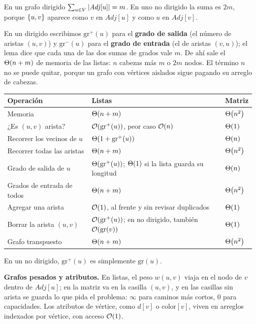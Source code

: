 \documentclass[11pt,letterpaper]{article}
\begin{document}
\begin{lema}
  \label{lem:busq-longitud-listas}
  En un grafo dirigido $\sum_{u \in V} \left\lvert \mathit{Adj}[u] \right\rvert = m$. En
  uno no dirigido la suma es $2m$, porque $\left\{ u, v \right\}$ aparece como
  $v$ en $\mathit{Adj}[u]$ y como $u$ en $\mathit{Adj}[v]$.
\end{lema}

En un dirigido escribimos $\text{gr}^{+}(u)$ para el \textbf{grado de
salida} (el número de aristas $(u, v)$) y $\text{gr}^{-}(u)$ para el
\textbf{grado de entrada} (el de aristas $(v, u)$); el lema dice que
cada una de las dos sumas de grados vale $m$. De ahí sale el
$\Theta\!\left(n + m\right)$ de memoria de las listas: $n$ cabezas más $m$ o $2m$
nodos. El término $n$ no se puede quitar, porque un grafo con
vértices aislados sigue pagando su arreglo de cabezas.

\begin{center}
\small
\begin{tabular}{l>{\raggedright\arraybackslash}p{6.1cm}%
                >{\raggedright\arraybackslash}p{3.6cm}}
  \toprule
  \textbf{Operación} & \textbf{Listas} & \textbf{Matriz} \\
  \midrule
  Memoria & $\Theta\!\left(n + m\right)$ & $\Theta\!\left(n^2\right)$ \\
  ¿Es $(u, v)$ arista? & $\mathcal{O}\!\left(\text{gr}^{+}(u)\right)$, peor caso
    $\mathcal{O}\!\left(n\right)$ & $\Theta\!\left(1\right)$ \\
  Recorrer los vecinos de $u$ & $\Theta\!\left(1 + \text{gr}^{+}(u)\right)$
    & $\Theta\!\left(n\right)$ \\
  Recorrer todas las aristas & $\Theta\!\left(n + m\right)$ & $\Theta\!\left(n^2\right)$ \\
  Grado de salida de $u$ & $\Theta\!\left(\text{gr}^{+}(u)\right)$; $\Theta\!\left(1\right)$ si la
    lista guarda su longitud & $\Theta\!\left(n\right)$ \\
  Grados de entrada de todos & $\Theta\!\left(n + m\right)$ & $\Theta\!\left(n^2\right)$ \\
  Agregar una arista & $\mathcal{O}\!\left(1\right)$, al frente y sin revisar duplicados
    & $\Theta\!\left(1\right)$ \\
  Borrar la arista $(u, v)$ & $\mathcal{O}\!\left(\text{gr}^{+}(u)\right)$; en no
    dirigido, también $\mathcal{O}\!\left(\text{gr}(v)\right)$ & $\Theta\!\left(1\right)$ \\
  Grafo transpuesto & $\Theta\!\left(n + m\right)$ & $\Theta\!\left(n^2\right)$ \\
  \bottomrule
\end{tabular}
\end{center}

En un no dirigido, $\text{gr}^{+}(u)$ es simplemente $\text{gr}(u)$.

\textbf{Grafos pesados y atributos.} En listas, el peso $w(u, v)$
viaja en el nodo de $v$ dentro de $\mathit{Adj}[u]$; en la matriz va
en la casilla $(u, v)$, y en las casillas sin arista se guarda lo que
pida el problema: $\infty$ para caminos más cortos, $0$ para
capacidades. Los atributos de vértice, como $d[v]$ o
$\text{color}[v]$, viven en arreglos indexados por vértice, con acceso
$\mathcal{O}\!\left(1\right)$.
\end{document}
